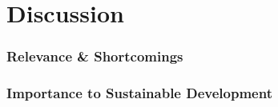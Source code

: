 	\section{Discussion}
	
	\subsubsection{Relevance \& Shortcomings}
	\subsubsection{Importance to Sustainable Development}
	